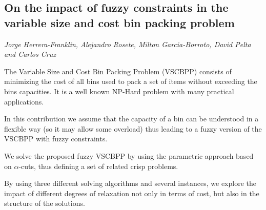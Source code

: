 \documentclass[../booklet.tex]{subfiles}
\begin{document}
\subsection[On the impact of fuzzy constraints in the variable size and cost bin packing problem. {\it Jorge Herrera-Franklin, Alejandro Rosete, Milton Garcia-Borroto, David Pelta and Carlos Cruz}]{On the impact of fuzzy constraints in the variable size and cost bin packing problem}
    

\begin{center}
  {\it Jorge Herrera-Franklin, Alejandro Rosete, Milton Garcia-Borroto, David Pelta and Carlos Cruz}
\end{center}



The Variable Size and Cost Bin Packing Problem (VSCBPP) consists of minimizing the cost of all bins used to pack a set of items without exceeding the bins capacities.
It is a well known NP-Hard problem with many practical applications.

In this contribution we assume that the capacity of a bin can be understood in a flexible way (so it may allow some overload) thus leading to a fuzzy version of the VSCBPP with fuzzy constraints.


We solve the proposed fuzzy VSCBPP by using the parametric approach based on $\alpha$-cuts, thus defining a set of related crisp problems.

By using three different solving algorithms and several instances, we explore the impact of different degrees of relaxation not only in terms of cost, but also in the structure of the solutions.


\end{document}
